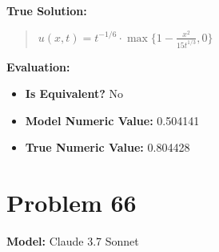 \documentclass{article}
\begin{document}
\textbf{True Solution:}
\begin{quote}
$u(x,t)=t^{-1/6}\cdot\max\{1-\frac{x^2}{15t^{1/3}},0\}$
\end{quote}

\textbf{Evaluation:}
\begin{itemize}
\item \textbf{Is Equivalent?} No
\item \textbf{Model Numeric Value:} 0.504141
\item \textbf{True Numeric Value:} 0.804428
\end{itemize}
\vspace{1cm}
\section*{Problem 66}
\textbf{Model:} Claude 3.7 Sonnet
\end{document}
